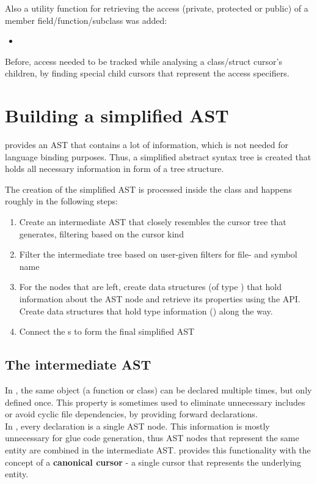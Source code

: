 Also a utility function for retrieving the access (private, protected or public) of a  member field/function/subclass was added:
\begin{itemize}\addtolength{\itemsep}{-0.5\baselineskip}
\item {}
\end{itemize}

Before, access needed to be tracked while analysing a class/struct cursor's children, by finding special child cursors that represent the  access specifiers.

\section{Building a simplified AST}

 provides an AST that contains a lot of information, which is not needed for language binding purposes. Thus, a simplified abstract syntax tree is created that holds all necessary information in form of a tree structure.

The creation of the simplified AST is processed inside the  class and happens roughly in the following steps:

\begin{enumerate}\addtolength{\itemsep}{-0.5\baselineskip}
\item Create an intermediate AST that closely resembles the cursor tree that  generates, filtering based on the cursor kind
\item Filter the intermediate tree based on user-given filters for file- and symbol name
\item For the nodes that are left, create data structures (of type ) that hold information about the AST node and retrieve its properties using the  API. Create data structures that hold type information () along the way.
\item Connect the s to form the final simplified AST 
\end{enumerate}

\subsection{The intermediate AST}

In , the same object (a function or class) can be declared multiple times, but only defined once. This property is sometimes used to eliminate unnecessary includes or avoid cyclic file dependencies, by providing forward declarations.\\
In , every declaration is a single AST node. This information is mostly unnecessary for glue code generation, thus AST nodes that represent the same  entity are combined in the intermediate AST.  provides this functionality with the concept of a \textbf{canonical cursor} - a single cursor that represents the underlying entity.

